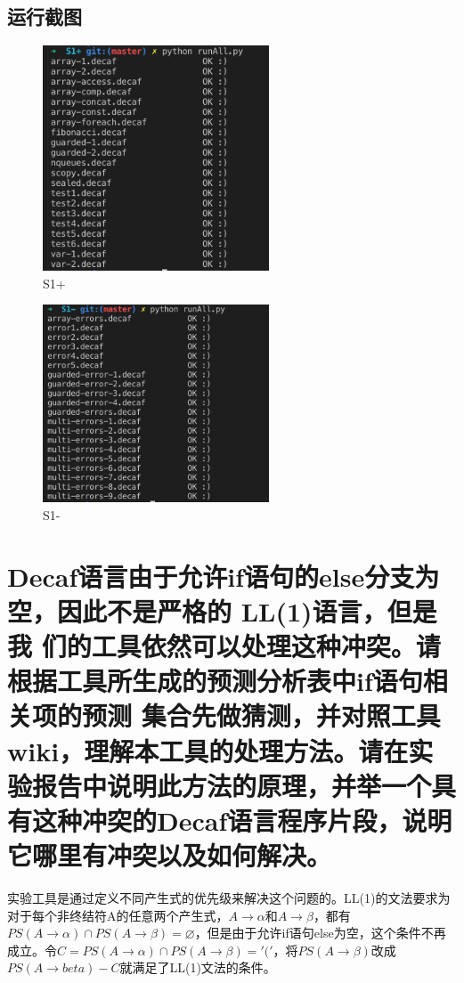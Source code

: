 \documentclass{article}
\begin{document}
\subsection{运行截图}
\begin{figure}[H]
    \includegraphics[width=0.60\textwidth]{1.png}
    \caption{S1+}
\end{figure}

\begin{figure}[H]
    \includegraphics[width=0.60\textwidth]{2.png}
    \caption{S1-}
\end{figure}

\section{Decaf语言由于允许if语句的else分支为空，因此不是严格的 LL(1)语言，但是我 们的工具依然可以处理这种冲突。请根据工具所生成的预测分析表中if语句相关项的预测 集合先做猜测，并对照工具wiki，理解本工具的处理方法。请在实验报告中说明此方法的原理，并举一个具有这种冲突的Decaf语言程序片段，说明它哪里有冲突以及如何解决。}
实验工具是通过定义不同产生式的优先级来解决这个问题的。LL(1)的文法要求为对于每个非终结符A的任意两个产生式，$A \rightarrow \alpha$和$A \rightarrow \beta$，都有$PS(A \rightarrow \alpha) \cap PS(A \rightarrow \beta) = \varnothing$，但是由于允许if语句else为空，这个条件不再成立。令$C = PS(A \rightarrow \alpha) \cap PS(A \rightarrow \beta) = {'('}$，将$PS(A \rightarrow \beta)$改成$PS(A \rightarrow beta) - C$就满足了LL(1)文法的条件。
\end{document}
